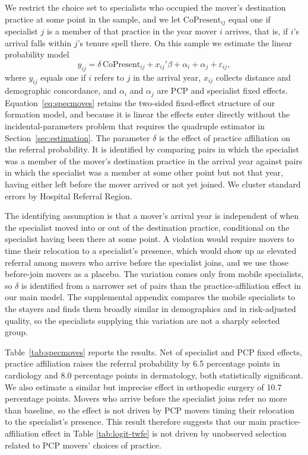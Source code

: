 \documentclass[12pt]{article}
\begin{document}
We restrict the choice set to specialists who occupied the mover's destination practice at some point in the sample, and we let $\mathrm{CoPresent}_{ij}$ equal one if specialist $j$ is a member of that practice in the year mover $i$ arrives, that is, if $i$'s arrival falls within $j$'s tenure spell there. On this sample we estimate the linear probability model
\begin{equation}\label{eq:specmoves}
 y_{ij} = \delta\,\mathrm{CoPresent}_{ij} + x_{ij}'\beta + \alpha_i + \alpha_j + \varepsilon_{ij},
\end{equation}
where $y_{ij}$ equals one if $i$ refers to $j$ in the arrival year, $x_{ij}$ collects distance and demographic concordance, and $\alpha_i$ and $\alpha_j$ are PCP and specialist fixed effects. Equation~\eqref{eq:specmoves} retains the two-sided fixed-effect structure of our formation model, and because it is linear the effects enter directly without the incidental-parameters problem that requires the quadruple estimator in Section~\ref{sec:estimation}. The parameter $\delta$ is the effect of practice affiliation on the referral probability. It is identified by comparing pairs in which the specialist was a member of the mover's destination practice in the arrival year against pairs in which the specialist was a member at some other point but not that year, having either left before the mover arrived or not yet joined. We cluster standard errors by Hospital Referral Region.

The identifying assumption is that a mover's arrival year is independent of when the specialist moved into or out of the destination practice, conditional on the specialist having been there at some point. A violation would require movers to time their relocation to a specialist's presence, which would show up as elevated referral among movers who arrive before the specialist joins, and we use those before-join movers as a placebo. The variation comes only from mobile specialists, so $\delta$ is identified from a narrower set of pairs than the practice-affiliation effect in our main model. The supplemental appendix compares the mobile specialists to the stayers and finds them broadly similar in demographics and in risk-adjusted quality, so the specialists supplying this variation are not a sharply selected group.

Table~\ref{tab:specmoves} reports the results. Net of specialist and PCP fixed effects, practice affiliation raises the referral probability by 6.5 percentage points in cardiology and 8.0 percentage points in dermatology, both statistically significant. We also estimate a similar but imprecise effect in orthopedic surgery of 10.7 percentage points. Movers who arrive before the specialist joins refer no more than baseline, so the effect is not driven by PCP movers timing their relocation to the specialist's presence. This result therefore suggests that our main practice-affiliation effect in Table \ref{tab:logit-twfe} is not driven by unobserved selection related to PCP movers' choices of practice.
\end{document}
